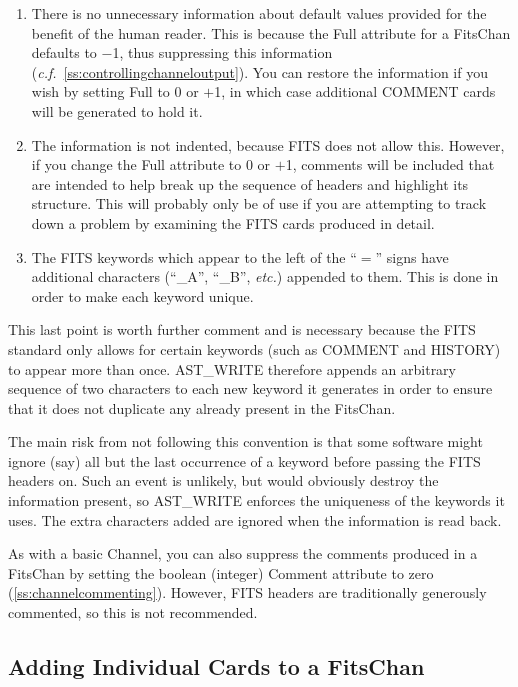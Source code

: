 \documentclass[twoside,11pt]{article}
\newcommand{\htmlref}[2]{#1}
\newcommand{\secref}[1]{\S\ref{#1}}
\renewcommand{\secref}[1]{\ref{#1}}
\begin{document}
\begin{enumerate}
\item There is no unnecessary information about default values
provided for the benefit of the human reader. This is because the \htmlref{Full}{Full}
attribute for a \htmlref{FitsChan}{FitsChan} defaults to $-$1, thus suppressing this
information ({\em{c.f.}}~\secref{ss:controllingchanneloutput}). You
can restore the information if you wish by setting Full to 0 or $+$1,
in which case additional COMMENT cards will be generated to hold it.

\item The information is not indented, because FITS does not allow
this. However, if you change the Full attribute to 0 or $+$1, comments
will be included that are intended to help break up the sequence of
headers and highlight its structure. This will probably only be of use
if you are attempting to track down a problem by examining the FITS
cards produced in detail.

\item The FITS keywords which appear to the left of the ``$=$'' signs
have additional characters (``\_A'', ``\_B'', {\em{etc.}}) appended to
them. This is done in order to make each keyword unique.
\end{enumerate}

This last point is worth further comment and is necessary because the
FITS standard only allows for certain keywords (such as COMMENT and
HISTORY) to appear more than once. \htmlref{AST\_WRITE}{AST_WRITE} therefore appends an
arbitrary sequence of two characters to each new keyword it generates
in order to ensure that it does not duplicate any already present in
the FitsChan.

The main risk from not following this convention is that some software
might ignore (say) all but the last occurrence of a keyword before
passing the FITS headers on. Such an event is unlikely, but would
obviously destroy the information present, so AST\_WRITE enforces the
uniqueness of the keywords it uses. The extra characters added are
ignored when the information is read back.

As with a basic Channel, you can also suppress the comments produced
in a FitsChan by setting the boolean (integer) \htmlref{Comment}{Comment} attribute to
zero (\secref{ss:channelcommenting}). However, FITS headers are
traditionally generously commented, so this is not recommended.

\subsection{\label{ss:addingfitscards}Adding Individual Cards to a FitsChan}
\end{document}
